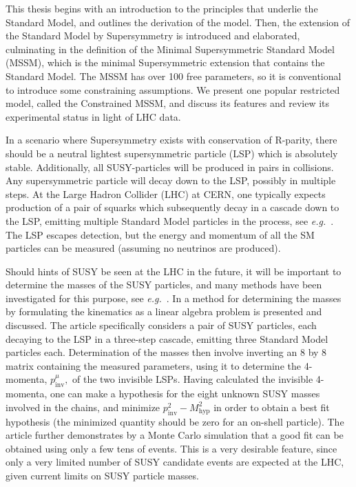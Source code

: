 \documentclass[twoside,english]{uiofysmaster}
\begin{document}
This thesis begins with an introduction to the principles that underlie the Standard Model, and outlines the derivation of the model. Then, the extension of the Standard Model by Supersymmetry is introduced and elaborated, culminating in the definition of the Minimal Supersymmetric Standard Model (MSSM), which is the minimal Supersymmetric extension that contains the Standard Model. The MSSM has over 100 free parameters, so it is conventional to introduce some constraining assumptions. We present one popular restricted model, called the Constrained MSSM, and discuss its features and review its experimental status in light of LHC data.

In a scenario where Supersymmetry exists with conservation of R-parity, there should be a neutral lightest supersymmetric particle (LSP) which is absolutely stable. Additionally, all SUSY-particles will be produced in pairs in collisions. Any supersymmetric particle will decay down to the LSP, possibly in multiple steps. At the Large Hadron Collider (LHC) at CERN, one typically expects production of a pair of squarks which subsequently decay in a cascade down to the LSP, emitting multiple Standard Model particles in the process, see {\it e.g.}~\cite{Martin:1997ns}. The LSP escapes detection, but the energy and momentum of all the SM particles can be measured (assuming no neutrinos are produced).

Should hints of SUSY be seen at the LHC in the future, it will be important to determine the masses of the SUSY particles, and many methods have been investigated for this purpose, see {\it e.g.}~\cite{Miller:2005zp}. In \cite{Webber:2009vm} a method for determining the masses by formulating the kinematics as a linear algebra problem is presented and discussed. The article specifically considers a pair of SUSY particles, each decaying to the LSP in a three-step cascade, emitting three Standard Model particles each. Determination of the masses then involve inverting an 8 by 8 matrix containing the measured parameters, using it to determine the 4-momenta, $p^\mu_\mathrm{inv},$ of the two invisible LSPs. Having calculated the invisible 4-momenta, one can make a hypothesis for the eight unknown SUSY masses involved in the chains, and minimize $p^2_\mathrm{inv}-M^2_\mathrm{hyp}$ in order to obtain a best fit hypothesis (the minimized quantity should be zero for an on-shell particle). The article further demonstrates by a Monte Carlo simulation that a good fit can be obtained using only a few tens of events. This is a very desirable feature, since only a very limited number of SUSY candidate events are  expected at the LHC, given current limits on SUSY particle masses.
\end{document}
